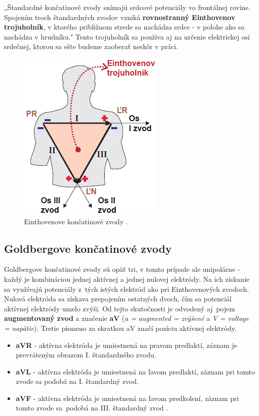 „Štandardné končatinové zvody snímajú srdcové potenciály vo frontálnej rovine. Spojením troch štandardných zvodov vzniká \textbf{rovnostranný Einthovenov trojuholník}, v ktorého približnom strede sa nachádza srdce - v polohe ako sa nachádza v hrudníku." \cite{Bada2010} Tento trojuholník sa používa aj na určenie elektrickej osi srdečnej, ktorou sa ešte budeme zaoberať neskôr v práci.

\begin{figure}[H]
    \centering
    \includegraphics[scale=0.50]{img/einthoven-triangle.png}
    \caption{Einthovenove končatinové zvody \cite{Blahút_2017a}.}
    \label{fig:einthoven}
\end{figure}

\subsection{Goldbergove končatinové zvody}

Goldbergove končatinové zvody sú opäť tri, v tomto prípade ale unipolárne - každý je kombináciou jednej aktívnej a jednej nulovej elektródy. Na ich získanie sa využívajú potenciály z~tých istých elektród ako pri Einthovenových zvodoch. Nulová elektróda sa získava prepojením ostatných dvoch, čím sa potenciál aktívnej elektródy umelo zvýši. Od tejto skutočnosti je odvodený aj~pojem \textbf{augmentovaný zvod} a značenie \textbf{aV} (\textit{a = augmented = zvýšené} a \textit{V = voltage = napätie}). Tretie písmeno za skratkou aV značí pozíciu aktívnej elektródy.

\begin{itemize}
    \item \textbf{aVR} - aktívna elektróda je umiestnená na pravom predlaktí, záznam je prevráteným obrazom I. štandardného zvodu.
    \item \textbf{aVL} - aktívna elektróda je umiestnená na ľavom predlaktí, záznam pri tomto zvode sa podobá na I. štandardný zvod.
    \item \textbf{aVF} - aktívna elektróda je umiestnená na ľavom predkolení, záznam pri tomto zvode sa~podobá na III. štandardný zvod \cite{Bada2010}\cite{garcia201512}.
\end{itemize}

